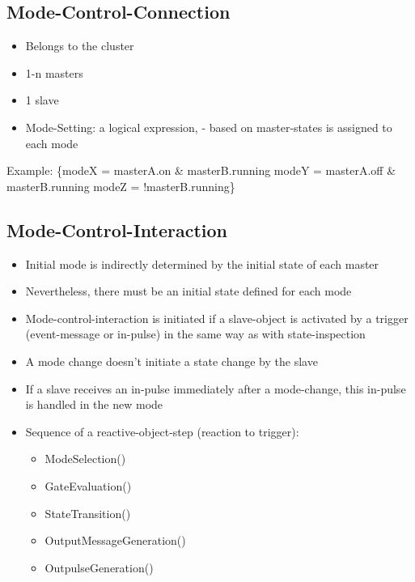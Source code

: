 \clearpage
\hypertarget{mode-control-connection}{%
\subsection{Mode-Control-Connection}\label{mode-control-connection}}

\begin{itemize}
\tightlist
\item
  Belongs to the cluster
\item
  1-n masters
\item
  1 slave
\item
  Mode-Setting: a logical expression, - based on master-states is
  assigned to each mode
\end{itemize}

Example: \{modeX = masterA.on \& masterB.running modeY = masterA.off \&
masterB.running modeZ = !masterB.running\}

\hypertarget{mode-control-interaction}{%
\subsection{Mode-Control-Interaction}\label{mode-control-interaction}}

\begin{itemize}
\tightlist
\item
  Initial mode is indirectly determined by the initial state of each
  master
\item
  Nevertheless, there must be an initial state defined for each mode
\item
  Mode-control-interaction is initiated if a slave-object is activated
  by a trigger (event-message or in-pulse) in the same way as with
  state-inspection
\item
  A mode change doesn't initiate a state change by the slave
\item
  If a slave receives an in-pulse immediately after a mode-change, this
  in-pulse is handled in the new mode
\item
  Sequence of a reactive-object-step (reaction to trigger):
  \begin{itemize}
      \item ModeSelection()
      \item GateEvaluation()
      \item StateTransition()
      \item OutputMessageGeneration()
      \item OutpulseGeneration()
  \end{itemize}
\end{itemize}

\clearpage